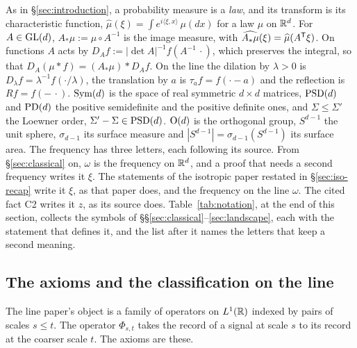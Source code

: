 As in \S\ref{sec:introduction}, a probability measure is a \emph{law}, and its transform is its
characteristic function, $\widehat\mu(\xi) = \int e^{i\langle\xi,x\rangle}\,\mu(dx)$ for a law $\mu$
on $\mathbb{R}^d$. For $A \in \mathrm{GL}(d)$, $A_*\mu := \mu \circ A^{-1}$ is the image measure, with
$\widehat{A_*\mu}(\xi) = \widehat\mu(A^{\mathsf{T}}\xi)$. On functions $A$ acts by
$D_Af := |\det A|^{-1}f(A^{-1}\,\cdot)$, which preserves the integral, so that
$D_A(\mu * f) = (A_*\mu) * D_Af$. On the line the dilation by $\lambda > 0$ is
$D_\lambda f = \lambda^{-1}f(\cdot/\lambda)$, the translation by $a$ is $\tau_af = f(\cdot - a)$ and
the reflection is $Rf = f(-\,\cdot)$. $\mathrm{Sym}(d)$ is the space of real symmetric $d \times d$
matrices, $\mathrm{PSD}(d)$ and $\mathrm{PD}(d)$ the positive semidefinite and the positive definite ones, and
$\Sigma \le \Sigma'$ the Loewner order, $\Sigma' - \Sigma \in \mathrm{PSD}(d)$. $\mathrm{O}(d)$ is the
orthogonal group, $S^{d-1}$ the unit sphere, $\sigma_{d-1}$ its surface measure and
$|S^{d-1}| = \sigma_{d-1}(S^{d-1})$ its surface area. The frequency has three letters, each
following its source. From \S\ref{sec:classical} on, $\omega$ is the frequency on $\mathbb{R}^d$, and a
proof that needs a second frequency writes it $\xi$. The
statements of the isotropic paper restated in \S\ref{sec:iso-recap} write it $\xi$, as that paper does,
and the frequency on the line $\omega$. The cited fact C2 writes it $z$, as its source does.
Table~\ref{tab:notation}, at the end of this section, collects the symbols of
\S\S\ref{sec:classical}--\ref{sec:landscape}, each with the statement that defines it, and the list
after it names the letters that keep a second meaning.

\subsection{The axioms and the classification on the line}\label{sec:line-axioms}

The line paper's object is a family of operators on $L^1(\mathbb{R})$ indexed by pairs of scales
$s \le t$. The operator $\Phi_{s,t}$ takes the record of a signal at scale $s$ to its record at the
coarser scale $t$. The axioms are these.

